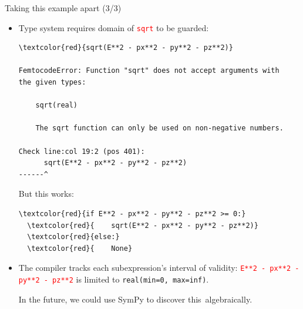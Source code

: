 \documentclass{beamer}
\begin{document}
\begin{frame}[fragile]{Taking this example apart (3/3)}
\vspace{0.2 cm}
\begin{itemize}
\item Type system requires domain of \textcolor{red}{\tt sqrt} to be guarded:

\scriptsize
\begin{Verbatim}[commandchars=\\\{\}]
  \textcolor{red}{sqrt(E**2 - px**2 - py**2 - pz**2)}

FemtocodeError: Function "sqrt" does not accept arguments with
the given types:

    sqrt(real)

    The sqrt function can only be used on non-negative numbers.

Check line:col 19:2 (pos 401):
      sqrt(E**2 - px**2 - py**2 - pz**2)
------^
\end{Verbatim}

\normalsize But this works:

\scriptsize
\begin{Verbatim}[commandchars=\\\{\}]
  \textcolor{red}{if E**2 - px**2 - py**2 - pz**2 >= 0:}
  \textcolor{red}{    sqrt(E**2 - px**2 - py**2 - pz**2)}
  \textcolor{red}{else:}
  \textcolor{red}{    None}
\end{Verbatim}

\normalsize

\item The compiler tracks each subexpression's interval of validity: \textcolor{red}{\tt\scriptsize E**2 - px**2 - py**2 - pz**2} is limited to \mbox{{\tt\scriptsize real(min=0, max=inf)}.\hspace{-1 cm}}

\vspace{0.2 cm}
In the future, we could use SymPy to discover \mbox{this algebraically.\hspace{-1 cm}}
\end{itemize}
\end{frame}
\end{document}
